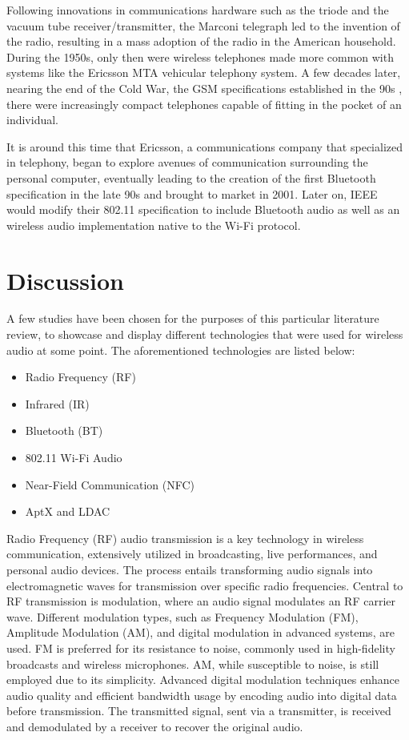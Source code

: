 \documentclass[conference]{IEEEtran}
\begin{document}
Following innovations in communications hardware such as the triode and the vacuum tube
receiver/transmitter\cite{white_pre-war_2003}, the Marconi telegraph led to the invention of
the radio, resulting in a mass adoption of the radio in the American household.\cite
{noauthor_ericsson_2001} During the 1950s, only then were wireless telephones made more
common with systems like the Ericsson MTA vehicular telephony system. A few decades later,
nearing the end of the Cold War, the GSM specifications established in the 90s
\cite{suresh_introduction_2023}, there were increasingly compact telephones capable of
fitting in the pocket of an individual.\cite{noauthor_ericsson_2001}

It is around this time that Ericsson, a communications company that specialized in telephony,
began to explore avenues of communication surrounding the personal computer, eventually
leading to the creation of the first Bluetooth specification in the late 90s and brought to
market in 2001.\cite{irekvist_bluetooth_2022} Later on, IEEE would modify their 802.11
specification to include Bluetooth audio as well as an wireless audio implementation native
to the Wi-Fi protocol.\cite{noauthor_bluetooth_nodate}

\vfill
\section*{Discussion}

A few studies have been chosen for the purposes of this particular literature review, to
showcase and display different technologies that were used for wireless audio at some point.
The aforementioned technologies are listed below:

\begin{itemize}
    \item Radio Frequency (RF)
    \item Infrared (IR)
    \item Bluetooth (BT)
    \item 802.11 Wi-Fi Audio
    \item Near-Field Communication (NFC)
    \item AptX and LDAC
\end{itemize}

Radio Frequency (RF) audio transmission is a key technology in wireless communication,
extensively utilized in broadcasting, live performances, and personal audio devices. The process
entails transforming audio signals into electromagnetic waves for transmission over specific
radio frequencies. Central to RF transmission is modulation, where an audio signal modulates an
RF carrier wave. Different modulation types, such as Frequency Modulation (FM), Amplitude
Modulation (AM), and digital modulation in advanced systems, are used. FM is preferred for its
resistance to noise, commonly used in high-fidelity broadcasts and wireless microphones. AM,
while susceptible to noise, is still employed due to its simplicity. Advanced digital modulation
techniques enhance audio quality and efficient bandwidth usage by encoding audio into digital
data before transmission. The transmitted signal, sent via a transmitter, is received and
demodulated by a receiver to recover the original audio. \cite{Scott_2022}
\end{document}
